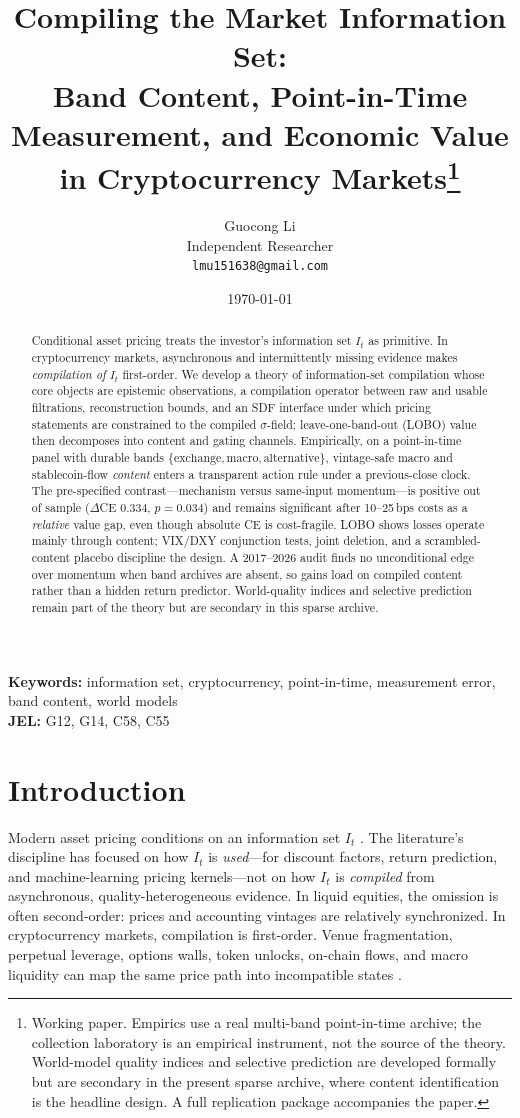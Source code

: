 \documentclass[12pt]{article}
\title{Compiling the Market Information Set:\\
Band Content, Point-in-Time Measurement, and Economic Value\\
in Cryptocurrency Markets\footnote{Working paper. Empirics use a real multi-band point-in-time archive; the collection laboratory is an empirical instrument, not the source of the theory. World-model quality indices and selective prediction are developed formally but are secondary in the present sparse archive, where content identification is the headline design. A full replication package accompanies the paper.}}
\author{Guocong Li\\
Independent Researcher\\
\texttt{lmu151638@gmail.com}}
\date{\today}
\begin{document}
\maketitle

\begin{abstract}
Conditional asset pricing treats the investor's information set $I_t$ as primitive. In cryptocurrency markets, asynchronous and intermittently missing evidence makes \emph{compilation of} $I_t$ first-order. We develop a theory of information-set compilation whose core objects are epistemic observations, a compilation operator between raw and usable filtrations, reconstruction bounds, and an SDF interface under which pricing statements are constrained to the compiled $\sigma$-field; leave-one-band-out (LOBO) value then decomposes into content and gating channels. Empirically, on a point-in-time panel with durable bands $\{\mathrm{exchange},\mathrm{macro},\mathrm{alternative}\}$, vintage-safe macro and stablecoin-flow \emph{content} enters a transparent action rule under a previous-close clock. The pre-specified contrast---mechanism versus same-input momentum---is positive out of sample ($\Delta$CE $0.334$, $p=0.034$) and remains significant after 10--25\,bps costs as a \emph{relative} value gap, even though absolute CE is cost-fragile. LOBO shows losses operate mainly through content; VIX/DXY conjunction tests, joint deletion, and a scrambled-content placebo discipline the design. A 2017--2026 audit finds no unconditional edge over momentum when band archives are absent, so gains load on compiled content rather than a hidden return predictor. World-quality indices and selective prediction remain part of the theory but are secondary in this sparse archive.
\end{abstract}

\noindent\textbf{Keywords:} information set, cryptocurrency, point-in-time, measurement error, band content, world models\\
\textbf{JEL:} G12, G14, C58, C55

\tableofcontents
\newpage

\section{Introduction}
\label{sec:intro}

Modern asset pricing conditions on an information set $I_t$ \citep{fama1993,cochrane2005,gu2020,kelly2019,nagel2021,harvey2016}. The literature's discipline has focused on how $I_t$ is \emph{used}---for discount factors, return prediction, and machine-learning pricing kernels---not on how $I_t$ is \emph{compiled} from asynchronous, quality-heterogeneous evidence. In liquid equities, the omission is often second-order: prices and accounting vintages are relatively synchronized. In cryptocurrency markets, compilation is first-order. Venue fragmentation, perpetual leverage, options walls, token unlocks, on-chain flows, and macro liquidity can map the same price path into incompatible states \citep{makarov2020,liu2022}.
\end{document}
